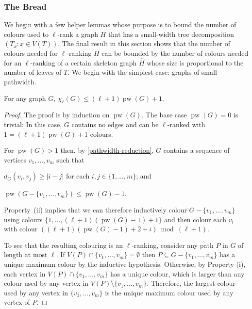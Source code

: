 \documentclass[kpfonts]{patmorin}
\DeclareMathOperator{\pw}{pw}
\newcommand{\lrn}{\chi_{\ell}}
\theoremstyle{named}
\begin{document}
\subsubsection{The Bread}

We begin with a few helper lemmas whose purpose is to bound the number of colours used to $\ell$-rank a graph $H$ that has a small-width tree decomposition $(T_x:x\in V(T))$.  The final result in this section shows that the number of colours needed for $\ell$-ranking $H$ can be bounded by the number of colours needed for an $\ell$-ranking of a certain skeleton graph $\hat{H}$ whose size is proportional to the number of leaves of $T$. We begin with the simplest case: graphs of small pathwidth.

\begin{lem}\label{pathwidth}
    For any graph $G$, $\lrn(G)\le (\ell+1)\pw(G) + 1$.
\end{lem}

\begin{proof}
    The proof is by induction on $\pw(G)$.  The base case $\pw(G)=0$ is trivial: In this case, $G$ contains no edges and can be $\ell$-ranked with $1 = (\ell+1)\pw(G)+1$ colours.

    For $\pw(G)>1$ then, by \cref{pathwidth-reduction}, $G$ contains a sequence of vertices $v_1,\ldots,v_m$  such that
    \begin{inparaenum}[(i)]
        \item $d_G(v_i,v_j) \ge |i-j|$ for each $i,j\in\{1,\ldots,m\}$; and
        \item $\pw(G-\{v_1,\ldots,v_m\})\le \pw(G)-1$.
    \end{inparaenum}
    Property~(ii) implies that we can therefore inductively colour $G-\{v_1,\ldots,v_m\}$ using colours $\{1,\ldots,(\ell+1)(\pw(G)-1)+1\}$ and then colour each $v_i$ with colour $((\ell+1)(\pw(G)-1)+2+i)\bmod (\ell+1)$.

    To see that the resulting colouring is an $\ell$-ranking, consider any path $P$ in $G$ of length at most $\ell$.  If $V(P)\cap\{v_1,\ldots,v_m\}=\emptyset$ then $P\subseteq G-\{v_1,\ldots,v_m\}$ has a unique maximum colour by the inductive hypothesis.  Otherwise, by Property (i), each vertex in  $V(P)\cap\{v_1,\ldots,v_m\}$ has a unique colour, which is larger than any colour used by any vertex in $V(P)\setminus\{v_1,\ldots,v_m\}$.  Therefore, the largest colour used by any vertex in $\{v_1,\ldots,v_m\}$ is the unique maximum colour used by any vertex of $P$.
\end{proof}
\end{document}
